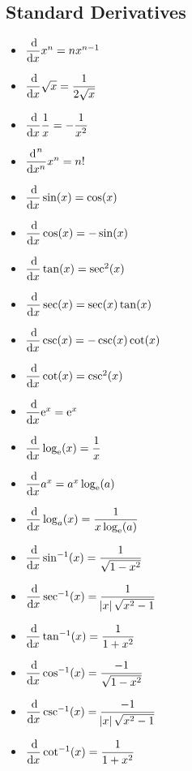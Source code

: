\documentclass[14]{article}
\theoremstyle{definition}
\begin{document}
\subsection{Standard Derivatives}
\begin{itemize}
\item $ \dfrac{\dif}{\dif x} x^n = nx^{n-1} $
\item $\dfrac{\dif}{\dif x} \sqrt{x} = \dfrac{1}{2 \sqrt{x}}$
\item $\dfrac{\dif}{\dif x} \dfrac{1}{x} = -\dfrac{1}{x^2}$
\item $\dfrac{\dif^{\;n}}{\dif x^n} x^n = n!$
\item $\dfrac{\dif}{\dif x} \sin(x) = \cos(x)$
\item $\dfrac{\dif}{\dif x} \cos(x) = -\sin(x)$
\item $\dfrac{\dif}{\dif x} \tan(x) = \sec^2(x)$
\item $\dfrac{\dif}{\dif x} \sec(x) = \sec(x) \tan(x)$
\item $\dfrac{\dif}{\dif x} \csc(x) = -\csc(x) \cot(x)$
\item $\dfrac{\dif}{\dif x} \cot(x) = \csc^2(x)$
\item $\dfrac{\dif}{\dif x} {\rm e}^x ={\rm e}^x$
\item $\dfrac{\dif}{\dif x} \log_{\rm e}(x) = \dfrac{1}{x}$
\item $\dfrac{\dif}{\dif x} a^x = a^x \log_{\rm e}(a)$
\item $\dfrac{\dif}{\dif x} \log_a(x) = \dfrac{1}{x \log_{\rm e}(a)}$
\item $\dfrac{\dif}{\dif x} \sin^{-1}(x) = \dfrac{1}{\sqrt{1 - x^2}}$
\item $\dfrac{\dif}{\dif x} \sec^{-1}(x) = \dfrac{1}{\abs{x} \sqrt{x^2 - 1}}$
\item $\dfrac{\dif}{\dif x} \tan^{-1}(x) = \dfrac{1}{1 + x^2}$
\item $\dfrac{\dif}{\dif x} \cos^{-1}(x) = \dfrac{-1}{\sqrt{1 - x^2}}$
\item $\dfrac{\dif}{\dif x} \csc^{-1}(x) = \dfrac{-1}{\abs{x} \sqrt{x^2 - 1}}$
\item $\dfrac{\dif}{\dif x} \cot^{-1}(x) = \dfrac{1}{1 + x^2}$
\end{itemize}
\pagebreak
\end{document}
